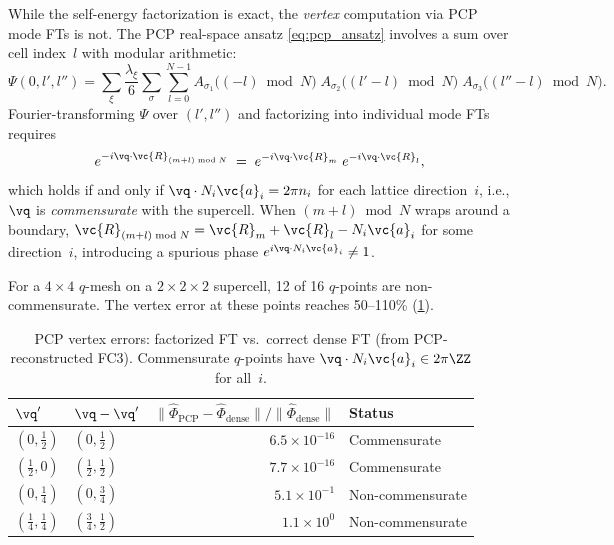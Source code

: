 While the self-energy factorization is exact, the \emph{vertex}
computation via PCP mode FTs is not.  The PCP real-space ansatz
\cref{eq:pcp_ansatz} involves a sum over cell index~$l$ with
modular arithmetic:
\begin{equation}
  \Psi(0, l', l'')
  = \sum_\xi \frac{\lambda_\xi}{6} \sum_\sigma \sum_{l=0}^{N-1}
    A_{\sigma_1}\bigl((-l) \bmod N\bigr)\;
    A_{\sigma_2}\bigl((l'-l) \bmod N\bigr)\;
    A_{\sigma_3}\bigl((l''-l) \bmod N\bigr).
\end{equation}
Fourier-transforming $\Psi$ over $(l', l'')$ and factorizing into
individual mode FTs requires
\begin{equation}\label{eq:phase_identity}
  e^{-i\vq\cdot\vc{R}_{(m+l)\bmod N}}
  \;=\; e^{-i\vq\cdot\vc{R}_m}\;e^{-i\vq\cdot\vc{R}_l},
\end{equation}
which holds if and only if
$\vq \cdot N_i\vc{a}_i = 2\pi n_i$ for each lattice
direction~$i$, i.e., $\vq$ is \emph{commensurate} with the
supercell.  When $(m + l) \bmod N$ wraps around a boundary,
$\vc{R}_{(m+l)\bmod N} = \vc{R}_m + \vc{R}_l - N_i\vc{a}_i$
for some direction~$i$, introducing a spurious phase
$e^{i\vq\cdot N_i\vc{a}_i} \neq 1$.

For a $4\times 4$ $q$-mesh on a $2\times 2\times 2$ supercell,
12 of 16 $q$-points are non-commensurate.  The vertex error
at these points reaches 50--110\% (\cref{tab:vertex_errors}).

\begin{table}[htbp]
  \centering
  \caption{PCP vertex errors: factorized FT vs.\ correct dense FT
    (from PCP-reconstructed FC3). Commensurate $q$-points have
    $\vq \cdot N_i\vc{a}_i \in 2\pi\ZZ$ for all~$i$.}
  \label{tab:vertex_errors}
  \begin{tabular}{llrl}
    \toprule
    $\vq'$ & $\vq-\vq'$ & $\|\hat\Phi_\mathrm{PCP} - \hat\Phi_\mathrm{dense}\|/\|\hat\Phi_\mathrm{dense}\|$ & Status \\
    \midrule
    $(0, \tfrac{1}{2})$       & $(0, \tfrac{1}{2})$       & $6.5\times10^{-16}$ & Commensurate \\
    $(\tfrac{1}{2}, 0)$       & $(\tfrac{1}{2}, \tfrac{1}{2})$ & $7.7\times10^{-16}$ & Commensurate \\
    \midrule
    $(0, \tfrac{1}{4})$       & $(0, \tfrac{3}{4})$       & $5.1\times10^{-1}$ & Non-commensurate \\
    $(\tfrac{1}{4}, \tfrac{1}{4})$ & $(\tfrac{3}{4}, \tfrac{1}{2})$ & $1.1\times10^{0}$ & Non-commensurate \\
    \bottomrule
  \end{tabular}
\end{table}


